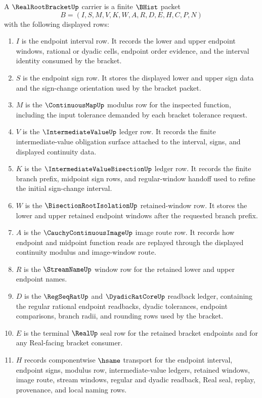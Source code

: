 \begin{definition}
\label{def:real-root-bracket-carrier}
A $\RealRootBracketUp$ carrier is a finite $\BHist$ packet
$$
B=(I,S,M,V,K,W,A,R,D,E,H,C,P,N)
$$
with the following displayed rows:
\begin{enumerate}
\item $I$ is the endpoint interval row. It records the lower and upper endpoint windows, rational or dyadic cells, endpoint order evidence, and the interval identity consumed by the bracket.
\item $S$ is the endpoint sign row. It stores the displayed lower and upper sign data and the sign-change orientation used by the bracket packet.
\item $M$ is the $\ContinuousMapUp$ modulus row for the inspected function, including the input tolerance demanded by each bracket tolerance request.
\item $V$ is the $\IntermediateValueUp$ ledger row. It records the finite intermediate-value obligation surface attached to the interval, signs, and displayed continuity data.
\item $K$ is the $\IntermediateValueBisectionUp$ ledger row. It records the finite branch prefix, midpoint sign rows, and regular-window handoff used to refine the initial sign-change interval.
\item $W$ is the $\BisectionRootIsolationUp$ retained-window row. It stores the lower and upper retained endpoint windows after the requested branch prefix.
\item $A$ is the $\CauchyContinuousImageUp$ image route row. It records how endpoint and midpoint function reads are replayed through the displayed continuity modulus and image-window route.
\item $R$ is the $\StreamNameUp$ window row for the retained lower and upper endpoint names.
\item $D$ is the $\RegSeqRatUp$ and $\DyadicRatCoreUp$ readback ledger, containing the regular rational endpoint readbacks, dyadic tolerances, endpoint comparisons, branch radii, and rounding rows used by the bracket.
\item $E$ is the terminal $\RealUp$ seal row for the retained bracket endpoints and for any Real-facing bracket consumer.
\item $H$ records componentwise $\hsame$ transport for the endpoint interval, endpoint signs, modulus row, intermediate-value ledgers, retained windows, image route, stream windows, regular and dyadic readback, Real seal, replay, provenance, and local naming rows.

\end{enumerate}
\end{definition}
